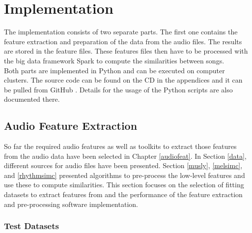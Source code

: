 \chapter{Implementation}\label{implementationdet}

The implementation consists of two separate parts. The first one contains the feature extraction and preparation of the data from the audio files. The results are stored in the feature files. These features files then have to be processed with the big data framework Spark to compute the similarities between songs.\\ 
Both parts are implemented in Python and can be executed on computer clusters. The source code can be found on the CD in the appendices and it can be pulled from GitHub \cite{github-code}. Details for the usage of the Python scripts are also documented there.

\section{Audio Feature Extraction}\label{simmet}

So far the required audio features as well as toolkits to extract those features from the audio data have been selected in Chapter \ref{audiofeat}.
In Section \ref{data}, different sources for audio files have been presented. Section \ref{musly}, \ref{melsimc}, and \ref{rhythmsimc} presented algorithms to pre-process the low-level features and use these to compute similarities. 
This section focuses on the selection of fitting datasets to extract features from and the performance of the feature extraction and pre-processing software implementation.  

\subsection{Test Datasets}

